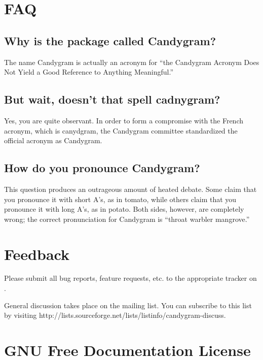 \documentclass{howto}
\begin{document}
\section{FAQ}

\subsection{Why is the package called Candygram?}
The name Candygram is actually an acronym for ``the Candygram Acronym Does Not
Yield a Good Reference to Anything Meaningful.''

\subsection{But wait, doesn't that spell {\sc cadnygram}?}
Yes, you are quite observant. In order to form a compromise with the French
acronym, which is {\sc canydgram}, the Candygram committee standardized the
official acronym as {\sc Candygram}.

\subsection{How do you pronounce Candygram?}
This question produces an outrageous amount of heated debate. Some claim that
you pronounce it with short A's, as in tomato, while others claim that you
pronounce it with long A's, as in potato. Both sides, however, are completely
wrong; the correct pronunciation for Candygram is ``throat warbler mangrove.''



\section{Feedback}

Please submit all bug reports, feature requests, etc. to the appropriate tracker
on .

General discussion takes place on the
 mailing list. You can subscribe
to this list by visiting 
	{http://lists.sourceforge.net/lists/listinfo/candygram-discuss}.



\appendix
\section{GNU Free Documentation License}
\label{fdl}





\end{document}
